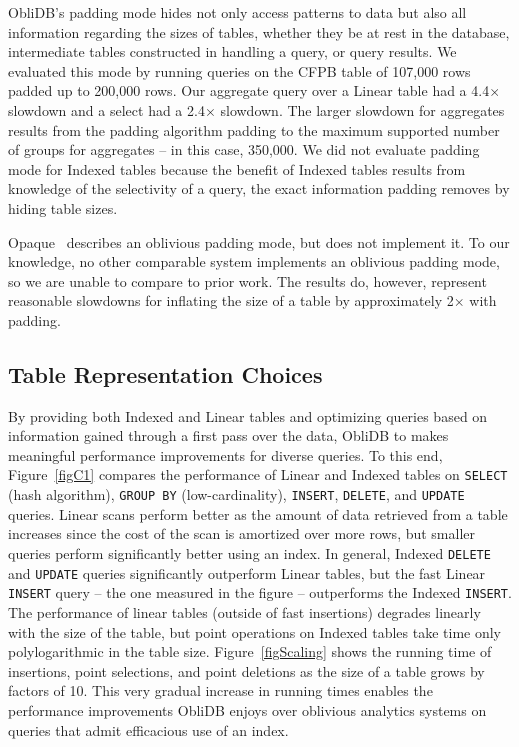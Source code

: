 \documentclass[letterpaper,twocolumn,10pt]{article}
\def\name/{ObliDB}
\begin{document}
\name/'s padding mode hides not only access patterns to data but also all information regarding the sizes of tables, whether they be at rest in the database, intermediate tables constructed in handling a query, or query results. We evaluated this mode by running queries on the CFPB table of 107,000 rows padded up to 200,000 rows. Our aggregate query over a Linear table had a 4.4$\times$ slowdown and a select had a 2.4$\times$ slowdown. The larger slowdown for aggregates results from the padding algorithm padding to the maximum supported number of groups for aggregates -- in this case, 350,000. We did not evaluate padding mode for Indexed tables because the benefit of Indexed tables results from knowledge of the selectivity of a query, the exact information padding removes by hiding table sizes.

Opaque~\cite{ZDB+17} describes an oblivious padding mode, but does not implement it. To our knowledge, no other comparable system implements an oblivious padding mode, so we are unable to compare to prior work. The results do, however, represent reasonable slowdowns for inflating the size of a table by approximately 2$\times$ with padding.

\subsection{Table Representation Choices}
By providing both Indexed and Linear tables and optimizing queries based on information gained through a first pass over the data, \name/ to makes meaningful performance improvements for diverse queries. To this end, Figure~\ref{figC1} compares the performance of Linear and Indexed tables on \texttt{SELECT} (hash algorithm), \texttt{GROUP BY} (low-cardinality), \texttt{INSERT}, \texttt{DELETE}, and \texttt{UPDATE} queries. Linear scans perform better as the amount of data retrieved from a table increases since the cost of the scan is amortized over more rows, but smaller queries perform significantly better using an index. In general, Indexed \texttt{DELETE} and \texttt{UPDATE} queries significantly outperform Linear tables, but the fast Linear \texttt{INSERT} query -- the one measured in the figure -- outperforms the Indexed \texttt{INSERT}. The performance of linear tables (outside of fast insertions) degrades linearly with the size of the table, but point operations on Indexed tables take time only polylogarithmic in the table size. Figure~\ref{figScaling} shows the running time of insertions, point selections, and point deletions as the size of a table grows by factors of 10. This very gradual increase in running times enables the performance improvements \name/ enjoys over oblivious analytics systems on queries that admit efficacious use of an index.
\end{document}
